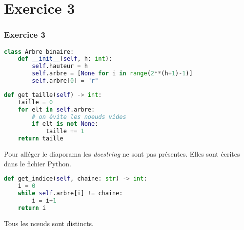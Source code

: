 \documentclass[svgnames,11pt]{beamer}
\begin{document}
\section{Exercice 3}
\begin{frame}[fragile]
    \frametitle{Exercice 3}

\begin{center}
\begin{lstlisting}[language=Python , basicstyle=\ttfamily\small, xleftmargin=.5em, xrightmargin=-1em]
class Arbre_binaire:
    def __init__(self, h: int):
        self.hauteur = h
        self.arbre = [None for i in range(2**(h+1)-1)]
        self.arbre[0] = "r"
\end{lstlisting}
\label{CODE}
\end{center}    

\end{frame}
\begin{frame}[fragile]

\begin{center}
\begin{lstlisting}[language=Python , basicstyle=\ttfamily\small, xleftmargin=.5em, xrightmargin=-1em]
def get_taille(self) -> int:
    taille = 0
    for elt in self.arbre:
        # on évite les noeuds vides
        if elt is not None:
            taille += 1
    return taille
\end{lstlisting}
\end{center}    
\begin{aretenir}[Remarque]
Pour alléger le diaporama les \emph{docstring} ne sont pas présentes. Elles sont écrites dans le fichier Python. 
\end{aretenir}
\end{frame}
\begin{frame}[fragile]

\begin{center}
\begin{lstlisting}[language=Python , basicstyle=\ttfamily\small, xleftmargin=.5em, xrightmargin=-1em]
def get_indice(self, chaine: str) -> int:
    i = 0
    while self.arbre[i] != chaine:
        i = i+1
    return i
\end{lstlisting}
\end{center}    
    \begin{aretenir}[Remarque]
    Tous les nœuds sont distincts.
    \end{aretenir}
    \end{frame}
\end{document}
